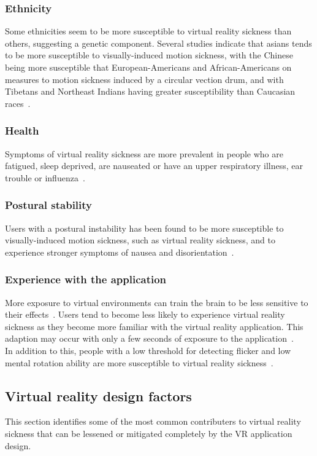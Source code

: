 \subsubsection{Ethnicity}
Some ethnicities seem to be more susceptible to virtual reality sickness than others, suggesting a genetic component. 
Several studies indicate that asians tends to be more susceptible to visually-induced motion sickness,
with the Chinese being more susceptible that European-Americans and African-Americans on measures to motion sickness induced by a circular vection drum, and with
Tibetans and Northeast Indians having greater susceptibility than Caucasian races~\citep{Barrett2004}.

\subsubsection{Health}
Symptoms of virtual reality sickness are more prevalent in people who are fatigued, sleep deprived, are nauseated or have an upper respiratory illness, 
ear trouble or influenza~\citep{Kolasinski1995}.

\subsubsection{Postural stability}
Users with a postural instability has been found to be more susceptible to visually-induced motion sickness, such as virtual reality sickness, and to experience
stronger symptoms of nausea and disorientation~\citep{Kolasinski1995}. 

\subsubsection{Experience with the application}
More exposure to virtual environments can train the brain to be less sensitive to their effects~\citep{Stanney2003}. Users tend to become less likely to experience
virtual reality sickness as they become more familiar with the virtual reality application. This adaption may occur with only a few seconds of exposure to the application~\citep{Kennedy1985}.\\


In addition to this, people with a low threshold for detecting flicker and low mental rotation ability are more susceptible to virtual reality sickness~\cite{Kolasinski1995}.

\subsection{Virtual reality design factors}
This section identifies some of the most common contributers to virtual reality sickness that can be lessened or mitigated completely by the VR application design.

